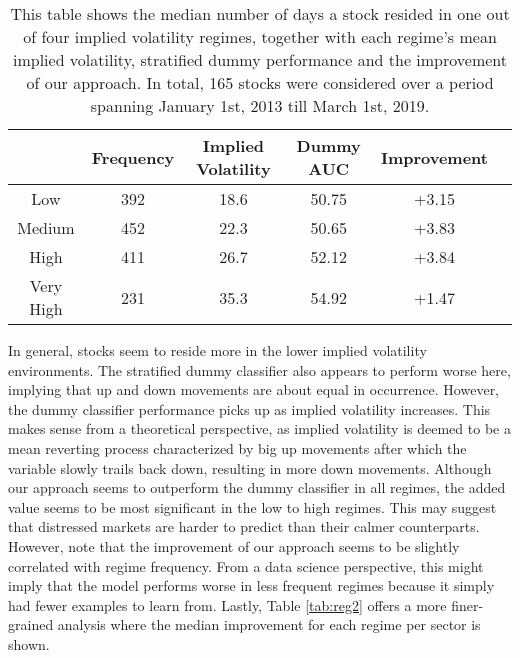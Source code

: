 \documentclass[preprint,1p, times,authoryear]{elsarticle}
\begin{document}

\begin{table}[!ht]
\centering
\setlength{\tabcolsep}{6pt}
\caption{This table shows the median number of days a stock resided in one out of four implied volatility regimes, together with each regime's mean implied volatility, stratified dummy performance and the improvement of our approach. In total, 165 stocks were considered over a period spanning January 1st, 2013 till March 1st, 2019. }
\begin{tabular}{cccccc}
\toprule
          & Frequency & Implied Volatility & Dummy AUC &  Improvement \\
\midrule
Low       & 392       & 18.6               & 50.75     & +3.15 &      \\
Medium    & 452       & 22.3               & 50.65     & +3.83 &      \\
High      & 411       & 26.7               & 52.12     & +3.84 &      \\
Very High & 231       & 35.3               & 54.92     & +1.47 &      \\
\midrule
\end{tabular}
\label{tab:reg1}
\end{table}

In general, stocks seem to reside more in the lower implied volatility environments. The stratified dummy classifier also appears to perform worse here, implying that up and down movements are about equal in occurrence. However, the dummy classifier performance picks up as implied volatility increases. This makes sense from a theoretical perspective, as implied volatility is deemed to be a mean reverting process characterized by big up movements after which the variable slowly trails back down, resulting in more down movements. Although our approach seems to outperform the dummy classifier in all regimes, the added value seems to be most significant in the low to high regimes. This may suggest that distressed markets are harder to predict than their calmer counterparts. However, note that the improvement of our approach seems to be slightly correlated with regime frequency. From a data science perspective, this might imply that the model performs worse in less frequent regimes because it simply had fewer examples to learn from. Lastly, Table \ref{tab:reg2} offers a more finer-grained analysis where the median improvement for each regime per sector is shown.
\end{document}

